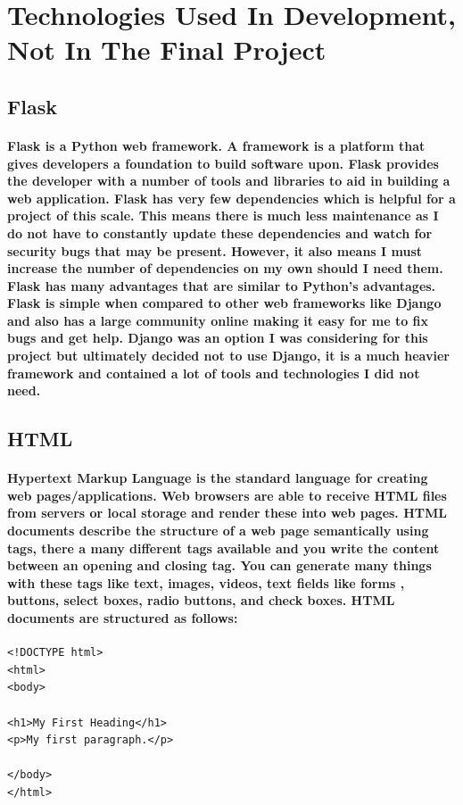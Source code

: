 \section{Technologies Used In Development, Not In The Final Project}

\subsection{Flask}
\paragraph{Flask is a Python web framework. A framework is a platform that gives developers a foundation to build software upon. Flask provides the developer with a number of tools and libraries to aid in building a web application. Flask has very few dependencies which is helpful for a project of this scale. This means there is much less maintenance as I do not have to constantly update these dependencies and watch for security bugs that may be present. However, it also means I must increase the number of dependencies on my own should I need them. Flask has many advantages that are similar to Python's advantages. Flask is simple when compared to other web frameworks like Django and also has a large community online making it easy for me to fix bugs and get help. Django was an option I was considering for this project but ultimately decided not to use Django, it is a much heavier framework and contained a lot of tools and technologies I did not need.}

\subsection{HTML}
\paragraph{Hypertext Markup Language is the standard language for creating web pages/applications. Web browsers are able to receive HTML files from servers or local storage and render these into web pages. HTML documents describe the structure of a web page semantically using tags, there a many different tags available and you write the content between an opening and closing tag. You can generate many things with these tags like text, images, videos, text fields like forms , buttons, select boxes, radio buttons, and check boxes. HTML documents are structured as follows:  }

\begin{verbatim}
<!DOCTYPE html>
<html>
<body>

<h1>My First Heading</h1>
<p>My first paragraph.</p>

</body>
</html>
\end{verbatim}


